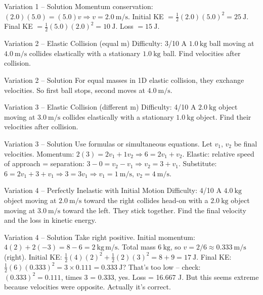 \documentclass[11pt]{beamer}
\begin{document}
\begin{frame}{Variation 1 – Solution}
Momentum conservation: $(2.0)(5.0) = (5.0)v \Rightarrow v = 2.0\ \mathrm{m/s}$.
Initial KE $= \frac12(2.0)(5.0)^2 = 25\ \mathrm{J}$.
Final KE $= \frac12(5.0)(2.0)^2 = 10\ \mathrm{J}$.
Loss $= 15\ \mathrm{J}$.
\end{frame}

\begin{frame}[shrink=15]{Variation 2 – Elastic Collision (equal m) \hfill Difficulty: 3/10}
A $1.0\ \mathrm{kg}$ ball moving at $4.0\ \mathrm{m/s}$ collides elastically with a stationary $1.0\ \mathrm{kg}$ ball. Find velocities after collision.
\end{frame}

\begin{frame}{Variation 2 – Solution}
For equal masses in 1D elastic collision, they exchange velocities. So first ball stops, second moves at $4.0\ \mathrm{m/s}$.
\end{frame}

\begin{frame}[shrink=15]{Variation 3 – Elastic Collision (different m) \hfill Difficulty: 4/10}
A $2.0\ \mathrm{kg}$ object moving at $3.0\ \mathrm{m/s}$ collides elastically with a stationary $1.0\ \mathrm{kg}$ object. Find their velocities after collision.
\end{frame}

\begin{frame}{Variation 3 – Solution}
Use formulas or simultaneous equations. Let $v_1$, $v_2$ be final velocities.
Momentum: $2(3) = 2v_1 + 1v_2 \Rightarrow 6 = 2v_1 + v_2$.
Elastic: relative speed of approach = separation: $3 - 0 = v_2 - v_1 \Rightarrow v_2 = 3 + v_1$.
Substitute: $6 = 2v_1 + 3 + v_1 \Rightarrow 3 = 3v_1 \Rightarrow v_1 = 1\ \mathrm{m/s}$, $v_2 = 4\ \mathrm{m/s}$.
\end{frame}

\begin{frame}[shrink=15]{Variation 4 – Perfectly Inelastic with Initial Motion \hfill Difficulty: 4/10}
A $4.0\ \mathrm{kg}$ object moving at $2.0\ \mathrm{m/s}$ toward the right collides head-on with a $2.0\ \mathrm{kg}$ object moving at $3.0\ \mathrm{m/s}$ toward the left. They stick together. Find the final velocity and the loss in kinetic energy.
\end{frame}

\begin{frame}{Variation 4 – Solution}
Take right positive. Initial momentum: $4(2) + 2(-3) = 8 - 6 = 2\ \mathrm{kg\,m/s}$.
Total mass $6\ \mathrm{kg}$, so $v = 2/6 \approx 0.333\ \mathrm{m/s}$ (right).
Initial KE: $\frac12(4)(2)^2 + \frac12(2)(3)^2 = 8 + 9 = 17\ \mathrm{J}$.
Final KE: $\frac12(6)(0.333)^2 = 3\times0.111 = 0.333\ \mathrm{J}$? That's too low – check: $(0.333)^2 = 0.111$, times 3 = 0.333, yes. Loss = 16.667 J. But this seems extreme because velocities were opposite. Actually it's correct.
\end{frame}
\end{document}
